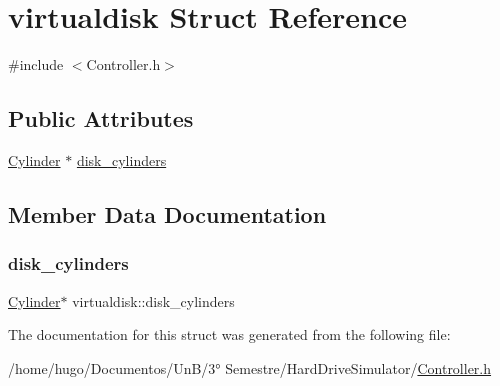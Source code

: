 \hypertarget{structvirtualdisk}{}\section{virtualdisk Struct Reference}
\label{structvirtualdisk}


{\ttfamily \#include $<$Controller.\+h$>$}

\subsection*{Public Attributes}
\begin{DoxyCompactItemize}
\item 
\hyperlink{Controller_8h_addd3f2f7957fb4e48765dc1d841ea61c}{Cylinder} $\ast$ \hyperlink{structvirtualdisk_a0dfc96065a52cbbdc40c7683f542064b}{disk\+\_\+cylinders}
\end{DoxyCompactItemize}


\subsection{Member Data Documentation}
\mbox{\label{structvirtualdisk_a0dfc96065a52cbbdc40c7683f542064b}} 
\subsubsection{\texorpdfstring{disk\+\_\+cylinders}{disk\_cylinders}}
{\footnotesize\ttfamily \hyperlink{Controller_8h_addd3f2f7957fb4e48765dc1d841ea61c}{Cylinder}$\ast$ virtualdisk\+::disk\+\_\+cylinders}



The documentation for this struct was generated from the following file\+:\begin{DoxyCompactItemize}
\item 
/home/hugo/\+Documentos/\+Un\+B/3° Semestre/\+Hard\+Drive\+Simulator/\hyperlink{Controller_8h}{Controller.\+h}\end{DoxyCompactItemize}
